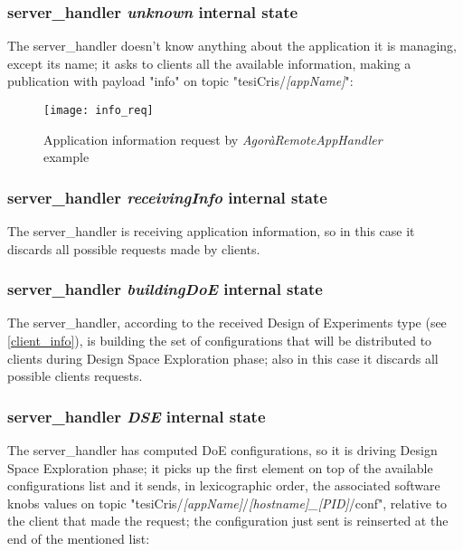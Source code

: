 \subsubsection{server\_handler \textit{unknown} internal state}\label{req_info}

The server\_handler doesn't know anything about the application it is managing, except its name; it asks to clients all the available information, making a publication with payload "info" on topic "tesiCris/\textit{[appName]}":

\begin{figure}[H]

    \centering
    \texttt{[image: info\_req]}
    \caption{Application information request by \textit{AgoràRemoteAppHandler} example}
    
\end{figure}


\subsubsection{server\_handler \textit{receivingInfo} internal state}

The server\_handler is receiving application information, so in this case it discards all possible requests made by clients.


\subsubsection{server\_handler \textit{buildingDoE} internal state}

The server\_handler, according to the received Design of Experiments type (see \ref{client_info}), is building the set of configurations that will be distributed to clients during Design Space Exploration phase; also in this case it discards all possible clients requests.


\subsubsection{server\_handler \textit{DSE} internal state}\label{dse_conf}

The server\_handler has computed DoE configurations, so it is driving Design Space Exploration phase; it picks up the first element on top of the available configurations list and it sends, in lexicographic order, the associated software knobs values on topic "tesiCris\slash{}\textit{[appName]}\slash{}\textit{[hostname]\_[PID]}\slash{}conf", relative to the client that made the request; the configuration just sent is reinserted at the end of the mentioned list:

